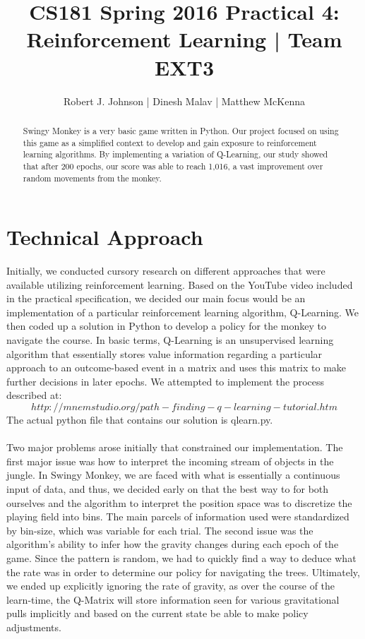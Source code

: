 \documentclass{article}
\begin{document}
\title{CS181 Spring 2016 Practical 4: Reinforcement Learning | Team EXT3}
\author{Robert J. Johnson | Dinesh Malav | Matthew McKenna}


\maketitle

\begin{abstract}
Swingy Monkey is a very basic game written in Python. Our project focused on using this game as a simplified context to develop and gain exposure to reinforcement learning algorithms. By implementing a variation of Q-Learning, our study showed that after 200 epochs, our score was able to reach 1,016, a vast improvement over random movements from the monkey.
\end{abstract}
\section{Technical Approach}
Initially, we conducted cursory research on different approaches that were available utilizing reinforcement learning. Based on the YouTube video included in the practical specification, we decided our main focus would be an implementation of  a particular reinforcement learning algorithm, Q-Learning. We then coded up a solution in Python to develop a policy for the monkey to navigate the course. In basic terms, Q-Learning is an unsupervised learning algorithm that essentially stores value information regarding a particular approach to an outcome-based event in a matrix and uses this matrix to make further decisions in later epochs. We attempted to implement the process described at:
$$http://mnemstudio.org/path-finding-q-learning-tutorial.htm$$
The actual python file that contains our solution is qlearn.py.\\\\
Two major problems arose initially that constrained our implementation. The first major issue was how to interpret the incoming stream of objects in the jungle. In Swingy Monkey, we are faced with what is essentially a continuous input of data, and thus, we decided early on that the best way to for both ourselves and the algorithm to interpret the position space was to discretize the playing field into bins. The main parcels of information used were standardized by bin-size, which was variable for each trial. The second issue was the algorithm's ability to infer how the gravity changes during each epoch of the game. Since the pattern is random, we had to quickly find a way to deduce what the rate was in order to determine our policy for navigating the trees. Ultimately, we ended up explicitly ignoring the rate of gravity, as over the course of the learn-time, the Q-Matrix will store information seen for various gravitational pulls implicitly and based on the current state be able to make policy adjustments.\\\\
\end{document}
